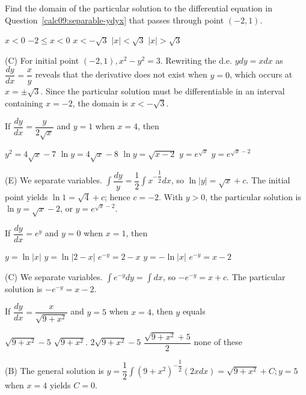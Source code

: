 \question
Find the domain of the particular solution to the differential equation in Question~\ref{calc09:separable-ydyx} that passes through point $(-2,1)$.
\begin{choices}
  \choice $x<0$
  \choice $-2 \leq x<0$
  \CorrectChoice $x<-\sqrt{3}$
  \choice $|x|<\sqrt{3}$
  \choice $|x|>\sqrt{3}$
\end{choices}
\begin{solution}
(C) For initial point $(-2,1), x^{2}-y^{2}=3$. Rewriting the d.e. $y d y=x d x$ as $\dfrac{d y}{d x}=\dfrac{x}{y}$ reveals that the derivative does not exist when $y=0$, which occurs at $x= \pm \sqrt{3}$. Since the particular solution must be differentiable in an interval containing $x=-2$, the domain is $x<-\sqrt{3}$.
\end{solution}

\question
If $\dfrac{d y}{d x}=\dfrac{y}{2 \sqrt{x}}$ and $y=1$ when $x=4$, then
\begin{choices}
  \choice $y^{2}=4 \sqrt{x}-7$
  \choice $\ln y=4 \sqrt{x}-8$
  \choice $\ln y=\sqrt{x-2}$
  \choice $y=e^{\sqrt{x}}$
  \CorrectChoice $y=e^{\sqrt{x}-2}$
\end{choices}
\begin{solution}
(E) We separate variables. $\int \dfrac{d y}{y}=\dfrac{1}{2} \int x^{-\dfrac{1}{2}} d x$, so $\ln |y|=\sqrt{x}+c$. The initial point yields $\ln 1=\sqrt{4}+c$; hence $c=-2$. With $y>0$, the particular solution is $\ln y=\sqrt{x}-2$, or $y=e^{\sqrt{x}-2}$.
\end{solution}

\question
If $\dfrac{d y}{d x}=e^{y}$ and $y=0$ when $x=1$, then
\begin{choices}
  \choice $y=\ln |x|$
  \choice $y=\ln |2-x|$
  \CorrectChoice $e^{-y}=2-x$
  \choice $y=-\ln |x|$
  \choice $e^{-y}=x-2$
\end{choices}
\begin{solution}
(C) We separate variables. $\int e^{-y} d y=\int d x$, so $-e^{-y}=x+c$. The particular solution is $-e^{-y}=x-2$.
\end{solution}


\newpage



\question
If $\dfrac{d y}{d x}=\dfrac{x}{\sqrt{9+x^{2}}}$ and $y=5$ when $x=4$, then $y$ equals
\begin{choices}
  \choice $\sqrt{9+x^{2}}-5$
  \CorrectChoice $\sqrt{9+x^{2}}$.
  \choice $2 \sqrt{9+x^{2}}-5$
  \choice $\dfrac{\sqrt{9+x^{2}}+5}{2}$
  \choice none of these
\end{choices}
\begin{solution}
(B) The general solution is $y=\dfrac{1}{2} \int\left(9+x^{2}\right)^{-\dfrac{1}{2}}(2 x d x)=\sqrt{9+x^{2}}+C ; y=5$ when $x=4$ yields $C=0$.
\end{solution}

